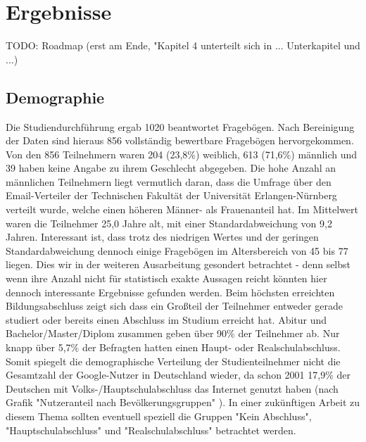 %
% 

\chapter{Ergebnisse}

TODO: Roadmap (erst am Ende, "Kapitel 4 unterteilt sich in ... Unterkapitel und ...)

\section{Demographie}
\label{sec:demo}
Die Studiendurchführung ergab 1020 beantwortet Fragebögen. Nach Bereinigung der Daten sind hieraus 856 vollständig bewertbare Fragebögen hervorgekommen.
Von den 856 Teilnehmern waren 204 (23,8\%) weiblich, 613 (71,6\%) männlich und 39 haben keine Angabe zu ihrem Geschlecht abgegeben. Die hohe Anzahl an männlichen Teilnehmern liegt vermutlich daran, dass die Umfrage über den Email-Verteiler der Technischen Fakultät der Universität Erlangen-Nürnberg verteilt wurde, welche einen höheren Männer- als Frauenanteil hat.
Im Mittelwert waren die Teilnehmer 25,0 Jahre alt, mit einer Standardabweichung von 9,2 Jahren.
Interessant ist, dass trotz des niedrigen Wertes und der geringen Standardabweichung dennoch einige Fragebögen im Altersbereich von 45 bis 77 liegen. Dies wir in der weiteren Ausarbeitung gesondert betrachtet - denn selbst wenn ihre Anzahl nicht für statistisch exakte Aussagen reicht könnten hier dennoch interessante Ergebnisse gefunden werden.
Beim höchsten erreichten Bildungsabschluss zeigt sich dass ein Großteil der Teilnehmer entweder gerade studiert oder bereits einen Abschluss im Studium erreicht hat. Abitur und Bachelor/Master/Diplom zusammen geben über 90\% der Teilnehmer ab. Nur knapp über 5,7\% der Befragten hatten einen Haupt- oder Realschulabschluss.
Somit spiegelt die demographische Verteilung der Studienteilnehmer nicht die Gesamtzahl der Google-Nutzer in Deutschland wieder, da schon 2001 17,9\% der Deutschen mit Volks-/Hauptschulabschluss das Internet genutzt haben (nach Grafik "Nutzeranteil nach Bevölkerungsgruppen" \cite{ard2001internetusage}). In einer zukünftigen Arbeit zu diesem Thema sollten eventuell speziell die Gruppen "Kein Abschluss", "Hauptschulabschluss" und "Realschulabschluss" betrachtet werden.

